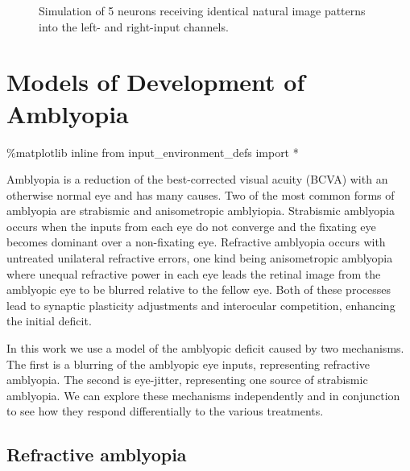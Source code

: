 \documentclass[
  letterpaper,
  number]{elsarticle}
\newenvironment{Shaded}{\begin{snugshade}}{\end{snugshade}}
\newcommand{\ImportTok}[1]{\textcolor[rgb]{0.00,0.46,0.62}{#1}}
\newcommand{\NormalTok}[1]{\textcolor[rgb]{0.00,0.23,0.31}{#1}}
\newcommand{\OperatorTok}[1]{\textcolor[rgb]{0.37,0.37,0.37}{#1}}
\begin{document}
\begin{figure}
\begin{minipage}[t]{\linewidth}
{{}

}

\end{minipage}%

\caption{\label{fig-nr_sim}Simulation of 5 neurons receiving identical
natural image patterns into the left- and right-input channels.}

\end{figure}

\hypertarget{sec-models-of-development}{%
\chapter{Models of Development of
Amblyopia}\label{sec-models-of-development}}

\begin{Shaded}
\begin{Highlighting}[]
\OperatorTok{\%}\NormalTok{matplotlib inline}
\ImportTok{from}\NormalTok{ input\_environment\_defs }\ImportTok{import} \OperatorTok{*}
\end{Highlighting}
\end{Shaded}

Amblyopia is a reduction of the best-corrected visual acuity (BCVA) with
an otherwise normal eye and has many causes\citep{wallace2018amblyopia}.
Two of the most common forms of amblyopia are strabismic and
anisometropic amblyiopia. Strabismic amblyopia occurs when the inputs
from each eye do not converge and the fixating eye becomes dominant over
a non-fixating eye. Refractive amblyopia occurs with untreated
unilateral refractive errors, one kind being anisometropic amblyopia
where unequal refractive power in each eye leads the retinal image from
the amblyopic eye to be blurred relative to the fellow eye. Both of
these processes lead to synaptic plasticity adjustments and interocular
competition, enhancing the initial deficit.

In this work we use a model of the amblyopic deficit caused by two
mechanisms. The first is a blurring of the amblyopic eye inputs,
representing refractive amblyopia. The second is eye-jitter,
representing one source of strabismic amblyopia. We can explore these
mechanisms independently and in conjunction to see how they respond
differentially to the various treatments.

\hypertarget{refractive-amblyopia}{%
\section{Refractive amblyopia}\label{refractive-amblyopia}}
\end{document}
